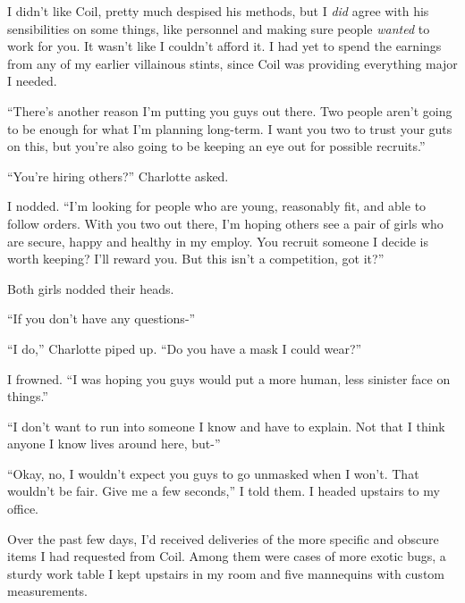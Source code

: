 I didn't like Coil, pretty much despised his methods, but I \emph{did} agree with his sensibilities on some things, like personnel and making sure people \emph{wanted} to work for you.  It wasn't like I couldn't afford it.  I had yet to spend the earnings from any of my earlier villainous stints, since Coil was providing everything major I needed.



``There's another reason I'm putting you guys out there.  Two people aren't going to be enough for what I'm planning long-term.  I want you two to trust your guts on this, but you're also going to be keeping an eye out for possible recruits.''



``You're hiring others?'' Charlotte asked.



I nodded.  ``I'm looking for people who are young, reasonably fit, and able to follow orders.  With you two out there, I'm hoping others see a pair of girls who are secure, happy and healthy in my employ.  You recruit someone I decide is worth keeping?  I'll reward you.  But this isn't a competition, got it?''



Both girls nodded their heads.



``If you don't have any questions-''



``I do,'' Charlotte piped up.  ``Do you have a mask I could wear?''



I frowned.  ``I was hoping you guys would put a more human, less sinister face on things.''



``I don't want to run into someone I know and have to explain.  Not that I think anyone I know lives around here, but-''



``Okay, no, I wouldn't expect you guys to go unmasked when I won't.  That wouldn't be fair.  Give me a few seconds,'' I told them.  I headed upstairs to my office.



Over the past few days, I'd received deliveries of the more specific and obscure items I had requested from Coil.  Among them were cases of more exotic bugs, a sturdy work table I kept upstairs in my room and five mannequins with custom measurements.



